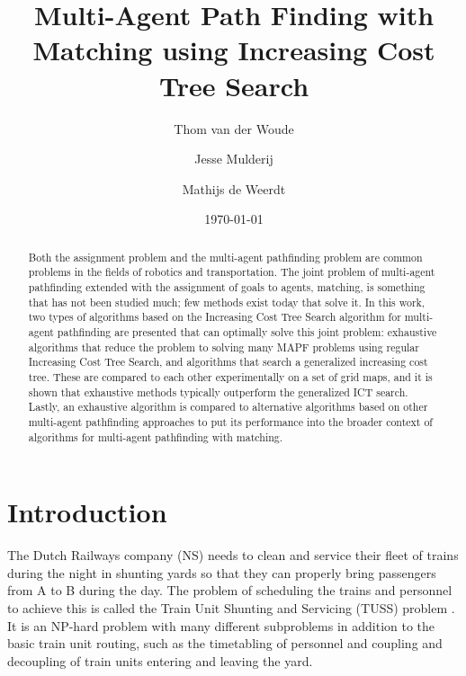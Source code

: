 \documentclass[english,10pt]{article}
\begin{document}
	
	\title{Multi-Agent Path Finding with Matching using Increasing Cost Tree Search}
	
	\author{Thom van der Woude\and Jesse Mulderij\and Mathijs de Weerdt}
	\date{\today}
	
	\maketitle
	
	\begin{abstract}
		Both the assignment problem and the multi-agent pathfinding problem are common problems in the fields of robotics and transportation. The joint problem of multi-agent pathfinding extended with the assignment of goals to agents, matching, is something that has not been studied much; few methods exist today that solve it. In this work, two types of algorithms based on the Increasing Cost Tree Search algorithm for multi-agent pathfinding are presented that can optimally solve this joint problem: exhaustive algorithms that reduce the problem to solving many MAPF problems using regular Increasing Cost Tree Search, and algorithms that search a generalized increasing cost tree. These are compared to each other experimentally on a set of grid maps, and it is shown that exhaustive methods typically outperform the generalized ICT search. Lastly, an exhaustive algorithm is compared to alternative algorithms based on other multi-agent pathfinding approaches to put its performance into the broader context of algorithms for multi-agent pathfinding with matching.
	\end{abstract}
	
	\section{Introduction}
	The Dutch Railways company (NS) needs to clean and service their fleet of trains during the night in shunting yards so that they can properly bring passengers from A to B during the day. 
	The problem of scheduling the trains and personnel to achieve this is called the Train Unit Shunting and Servicing (TUSS) problem \cite{mulderij2020}. 
	It is an NP-hard problem with many different subproblems in addition to the basic train unit routing, such as the timetabling of personnel and coupling and decoupling of train units entering and leaving the yard. %
	
\end{document}
